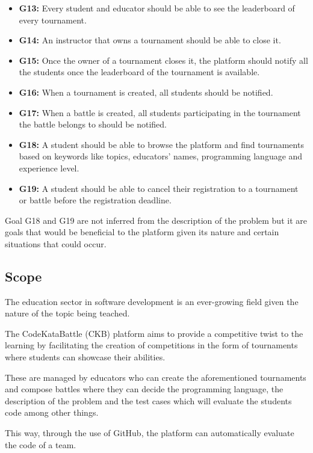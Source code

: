 \documentclass{article}
\begin{document}
\begin{itemize}
    \item \textbf{G13:} Every student and educator should be able to see the leaderboard of every tournament.
    \item \textbf{G14:} An instructor that owns a tournament should be able to close it.
    \item \textbf{G15:} Once the owner of a tournament closes it, the platform should notify all the students once the leaderboard of the tournament is available.
    \item \textbf{G16:} When a tournament is created, all students should be notified. 
    \item \textbf{G17:} When a battle is created, all students participating in the tournament the battle belongs to should be notified.
    \item \textbf{G18:} A student should be able to browse the platform and find tournaments based on keywords like topics, educators' names, programming language and experience level.
    \item \textbf{G19:} A student should be able to cancel their registration to a tournament or battle before the registration deadline.

\end{itemize}

Goal G18 and G19 are not inferred from the description of the problem but it are goals that would be beneficial to the platform given its nature and certain situations that could occur.

\newpage

\subsection{Scope}  

The education sector in software development is an ever-growing field given the nature of the topic 
being teached. 

The CodeKataBattle (CKB) platform aims to provide a competitive twist to the learning
by facilitating the creation of competitions in the form of tournaments where students can showcase their abilities.

These are managed by educators who can create the aforementioned tournaments and compose battles where they can decide 
the programming language, the description of the problem and the test cases which will evaluate the students code among other things.

This way, through the use of GitHub, the platform can automatically evaluate the code of a team.
\end{document}

